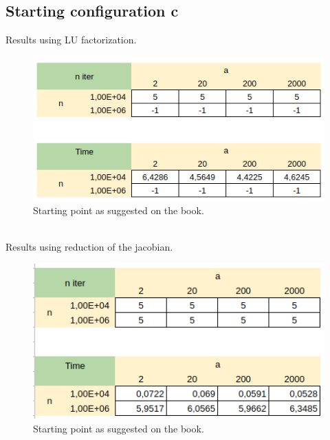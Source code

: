\documentclass[]{article}
\begin{document}
\subsection{Starting configuration c}
Results using LU factorization.\\
\begin{figure}[h]
	\includegraphics[width=12cm]{table4.png}
	\caption{Starting point as suggested on the book.}
\end{figure}\\
Results using reduction of the jacobian.
\begin{figure}[h]
	\includegraphics[width=12cm]{table1.png}
	\caption{Starting point as suggested on the book.}
\end{figure}
\pagebreak
\end{document}
